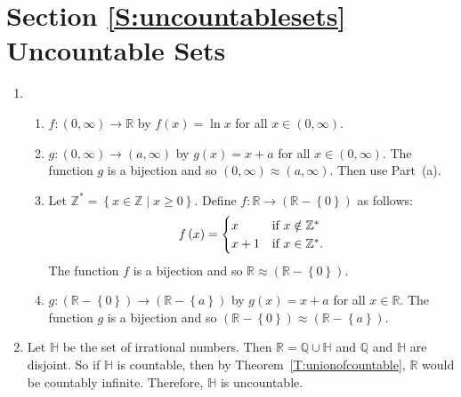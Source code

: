 \section*{Section \ref{S:uncountablesets} Uncountable Sets}

\begin{enumerate}
\item \begin{enumerate}
\item $f:\left( 0, \infty \right) \to \mathbb{R}$ by $f \left( x \right) = \ln x$ for all 
$x \in \left( 0, \infty \right)$.

\item $g: \left( 0, \infty \right) \to \left( a, \infty \right)$ by $g \left( x \right) = x + a$ for all $x \in \left( 0, \infty \right)$.  The function $g$ is a bijection and so 
$\left( 0, \infty \right) \approx \left( a, \infty \right)$.  Then use Part~(a).

\item Let $\mathbb{Z}^* = \left\{ x \in \mathbb{Z} \mid x \geq 0 \right\}$.  Define 
$f : \mathbb{R} \to \left( \mathbb{R} - \left\{ 0 \right\} \right)$ as follows:
\begin{equation} \notag
f \left( x \right) = 
\begin{cases}
x         &\text{if } x \notin \mathbb{Z}^* \\
x +1        &\text{if } x \in \mathbb{Z}^*.
\end{cases}
\end{equation}
The function $f$ is a bijection and so 
$\mathbb{R} \approx \left( \mathbb{R} - \left\{ 0 \right\} \right)$.


\item $g: \left( \mathbb{R} - \left\{ 0 \right\} \right) \to 
\left( \mathbb{R} - \left\{ a \right\} \right)$ by $g \left( x \right) = x + a$ for all 
$x \in \mathbb{R}$.  The function $g$ is a bijection and so 
$\left( \mathbb{R} - \left\{ 0 \right\} \right) \approx 
\left( \mathbb{R} - \left\{ a \right\} \right)$.

\end{enumerate}

\item Let $\mathbb{H}$ be the set of irrational numbers.  Then 
$\mathbb{R} = \mathbb{Q} \cup \mathbb{H}$ and $\mathbb{Q}$ and $\mathbb{H}$ are disjoint.  So if $\mathbb{H}$ is countable, then by Theorem~\ref{T:unionofcountable}, $\mathbb{R}$ would be countably infinite.  Therefore, $\mathbb{H}$ is uncountable.


\end{enumerate}
